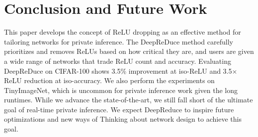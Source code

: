 


%

\section{Conclusion and Future Work} \label{sec:Conclusion}
This paper develops the concept of ReLU dropping  
as an effective method for tailoring networks for private inference.
The DeepReDuce method carefully prioritizes and
removes ReLUs based on how critical they are, and users are given a
wide range of networks that trade ReLU count and accuracy.
Evaluating DeepReDuce on CIFAR-100 shows 3.5\% improvement at iso-ReLU and 3.5$\times$ ReLU reduction at iso-accuracy. 
We also perform the experiments on TinyImageNet, which is uncommon for private inference work given the long runtimes. 
While we advance the state-of-the-art, we still fall short of the ultimate goal of real-time private inference.
We expect DeepReduce to inspire future optimizations and new ways of Thinking about network design to achieve this goal.




